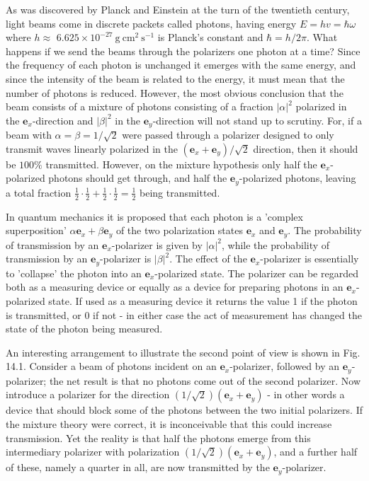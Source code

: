 \documentclass[hyperref,UTF8]{ctexbook}
\begin{document}
As was discovered by Planck and Einstein at the turn of the twentieth century, light beams come in discrete packets called photons, having energy $E=h v=\hbar \omega$ where $h \approx$ $6.625 \times 10^{-27} \mathrm{~g} \mathrm{~cm}^{2} \mathrm{~s}^{-1}$ is Planck's constant and $\hbar=h / 2 \pi$. What happens if we send the beams through the polarizers one photon at a time? Since the frequency of each photon is unchanged it emerges with the same energy, and since the intensity of the beam is related to the energy, it must mean that the number of photons is reduced. However, the most obvious conclusion that the beam consists of a mixture of photons consisting of a fraction $|\alpha|^{2}$ polarized in the $\mathbf{e}_{x}$-direction and $|\beta|^{2}$ in the $\mathbf{e}_{y}$-direction will not stand up to scrutiny. For, if a beam with $\alpha=\beta=1 / \sqrt{2}$ were passed through a polarizer designed to only transmit waves linearly polarized in the $\left(\mathbf{e}_{x}+\mathbf{e}_{y}\right) / \sqrt{2}$ direction, then it should be $100 \%$ transmitted. However, on the mixture hypothesis only half the $\mathbf{e}_{x}$-polarized photons should get through, and half the $\mathbf{e}_{y}$-polarized photons, leaving a total fraction $\frac{1}{2} \cdot \frac{1}{2}+\frac{1}{2} \cdot \frac{1}{2}=\frac{1}{2}$ being transmitted.

In quantum mechanics it is proposed that each photon is a 'complex superposition' $\alpha \mathbf{e}_{x}+\beta \mathbf{e}_{y}$ of the two polarization states $\mathbf{e}_{x}$ and $\mathbf{e}_{y}$. The probability of transmission by an $\mathbf{e}_{x}$-polarizer is given by $|\alpha|^{2}$, while the probability of transmission by an $\mathbf{e}_{y}$-polarizer is $|\beta|^{2}$. The effect of the $\mathbf{e}_{x}$-polarizer is essentially to 'collapse' the photon into an $\mathbf{e}_{x}$-polarized state. The polarizer can be regarded both as a measuring device or equally as a device for preparing photons in an $\mathbf{e}_{x}$-polarized state. If used as a measuring device it returns the value 1 if the photon is transmitted, or 0 if not - in either case the act of measurement has changed the state of the photon being measured.

An interesting arrangement to illustrate the second point of view is shown in Fig. 14.1. Consider a beam of photons incident on an $\mathbf{e}_{x}$-polarizer, followed by an $\mathbf{e}_{y}$-polarizer; the net result is that no photons come out of the second polarizer. Now introduce a polarizer for the direction $(1 / \sqrt{2})\left(\mathbf{e}_{x}+\mathbf{e}_{y}\right)$ - in other words a device that should block some of the photons between the two initial polarizers. If the mixture theory were correct, it is inconceivable that this could increase transmission. Yet the reality is that half the photons emerge from this intermediary polarizer with polarization $(1 / \sqrt{2})\left(\mathbf{e}_{x}+\mathbf{e}_{y}\right)$, and a further half of these, namely a quarter in all, are now transmitted by the $\mathbf{e}_{y}$-polarizer.
\end{document}
